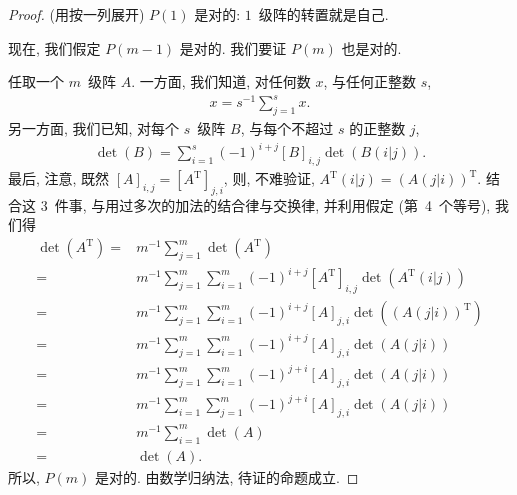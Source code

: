 \documentclass[../libro.tex]{subfiles}
\begin{document}
\begin{proof}
    (用按一列展开)
    \(P(1)\) 是对的:
    \(1\)~级阵的转置就是自己.

    现在, 我们假定 \(P(m-1)\) 是对的.
    我们要证 \(P(m)\) 也是对的.

    任取一个 \(m\)~级阵 \(A\).
    一方面, 我们知道,
    对任何数 \(x\), 与任何正整数 \(s\),
    \begin{align*}
        x = s^{-1} \sum_{j = 1}^{s} {x}.
    \end{align*}
    另一方面, 我们已知,
    对每个 \(s\)~级阵 \(B\),
    与每个不超过 \(s\) 的正整数 \(j\),
    \begin{align*}
        \det {(B)}
        = \sum_{i = 1}^{s} {(-1)^{i+j} [B]_{i,j} \det {(B(i|j))}}.
    \end{align*}
    最后, 注意, 既然
    \([A]_{i,j} = [A^{\mathrm{T}}]_{j,i}\),
    则, 不难验证,
    \(A^{\mathrm{T}}(i|j) = (A(j|i))^{\mathrm{T}}\).
    结合这 \(3\)~件事,
    与用过多次的加法的结合律与交换律,
    并利用假定 (第~4~个等号), 我们得
    \begin{align*}
        \det {(A^{\mathrm{T}})}
        = {} &
        m^{-1}
        \sum_{j=1}^{m}
        {\det {(A^{\mathrm{T}})}}
        \\
        = {} &
        m^{-1}
        \sum_{j=1}^{m} {
            \sum_{i=1}^{m} {
                (-1)^{i+j} [A^{\mathrm{T}}]_{i,j}
        \det {(A^{\mathrm{T}}(i|j))}}}
        \\
        = {} &
        m^{-1}
        \sum_{j=1}^{m} {
            \sum_{i=1}^{m} {
                (-1)^{i+j} [A]_{j,i}
        \det {((A(j|i))^{\mathrm{T}})}}}
        \\
        = {} &
        m^{-1}
        \sum_{j=1}^{m} {
            \sum_{i=1}^{m} {
                (-1)^{i+j} [A]_{j,i}
        \det {(A(j|i))}}}
        \\
        = {} &
        m^{-1}
        \sum_{j=1}^{m} {
            \sum_{i=1}^{m} {
                (-1)^{j+i} [A]_{j,i}
        \det {(A(j|i))}}}
        \\
        = {} &
        m^{-1}
        \sum_{i=1}^{m} {
            \sum_{j=1}^{m} {
                (-1)^{j+i} [A]_{j,i}
        \det {(A(j|i))}}}
        \\
        = {} &
        m^{-1}
        \sum_{i=1}^{m}
        {\det {(A)}}
        \\
        = {} & \det {(A)}.
    \end{align*}
    所以, \(P(m)\) 是对的.
    由数学归纳法, 待证的命题成立.
\end{proof}
\end{document}
